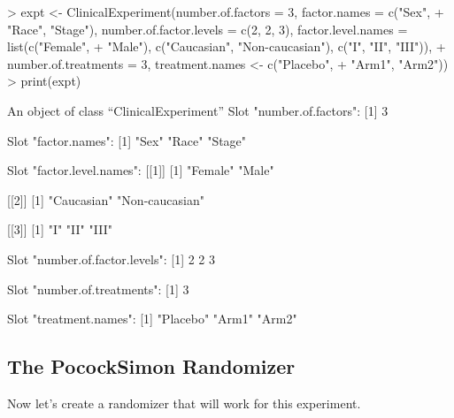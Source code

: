 \documentclass[11pt, letter]{article}
\numberwithin{equation}{section}
\begin{document}
\begin{Schunk}
\begin{Sinput}
> expt <- ClinicalExperiment(number.of.factors = 3, factor.names = c("Sex", 
+     "Race", "Stage"), number.of.factor.levels = c(2, 2, 3), factor.level.names = list(c("Female", 
+     "Male"), c("Caucasian", "Non-caucasian"), c("I", "II", "III")), 
+     number.of.treatments = 3, treatment.names <- c("Placebo", 
+         "Arm1", "Arm2"))
> print(expt)
\end{Sinput}
\begin{Soutput}
An object of class “ClinicalExperiment”
Slot "number.of.factors":
[1] 3

Slot "factor.names":
[1] "Sex"   "Race"  "Stage"

Slot "factor.level.names":
[[1]]
[1] "Female" "Male"  

[[2]]
[1] "Caucasian"     "Non-caucasian"

[[3]]
[1] "I"   "II"  "III"


Slot "number.of.factor.levels":
[1] 2 2 3

Slot "number.of.treatments":
[1] 3

Slot "treatment.names":
[1] "Placebo" "Arm1"    "Arm2"   
\end{Soutput}
\end{Schunk}

\subsection{The PocockSimon Randomizer}
\label{sec:ps-randomizer}

Now let's create a randomizer that will work for this experiment.
\end{document}

